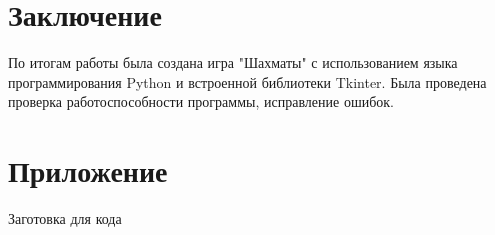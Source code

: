 \documentclass[14pt, oneside]{altsu-report}
\begin{document}




%
\chapter*{Заключение}

По итогам работы была создана игра "Шахматы" с использованием языка программирования Python и встроенной библиотеки Tkinter. Была проведена проверка работоспособности программы, исправление ошибок.

\newpage
{}
\printbibliography[title={Список использованной литературы}]

\appendix
\newpage
\chapter*{\raggedleft\label{appendix1}Приложение}

\begin{center}
\label{code:appendix}Заготовка для кода
\end{center}

\begin{code}
\vspace{-1cm}\inputminted{C}{}
\end{code}
\end{document}
